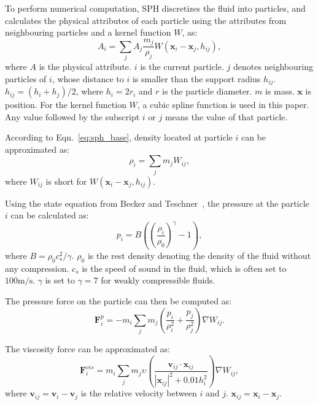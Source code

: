 \documentclass[VANCOUVER,STIX1COL]{WileyNJD-v2}
\begin{document}
To perform numerical computation, SPH discretizes the fluid into particles, and calculates the physical attributes of each particle using the attributes from neighbouring particles and a kernel function $W$, as:
\begin{equation}
    A_i = \sum_j A_j \frac{m_j}{\rho_j} W(\mathbf{x}_i - \mathbf{x}_j, h_{ij}),
    \label{eq:sph_base}
\end{equation}
where $A$ is the physical attribute. $i$ is the current particle. $j$ denotes neighbouring particles of $i$, whose distance to $i$ is smaller than the support radius $h_{ij}$. $h_{ij} = (h_i + h_j) / 2$, where $h_i = 2r_i$ and $r$ is the particle diameter. $m$ is mass. $\mathbf{x}$ is position. For the kernel function $W$, a cubic spline function is used in this paper. Any value followed by the subscript $i$ or $j$ means the value of that particle.

According to Eqn.~\ref{eq:sph_base}, density located at particle $i$ can be approximated as:
\begin{equation}
    \rho_i = \sum_j m_j W_{ij},
    \label{eq:sph_density}
\end{equation}
where $W_{ij}$ is short for $W(\mathbf{x}_i - \mathbf{x}_j, h_{ij})$.

Using the state equation from Becker and Teschner~\cite{Becker07}, the pressure at the particle $i$ can be calculated as:
\begin{equation}
    p_i = B\left(\left(\frac{\rho_i}{\rho_0}\right)^\gamma - 1\right),
\end{equation}
where $B = \rho_0 c_s^2 / \gamma$. $\rho_0$ is the rest density denoting the density of the fluid without any compression. $c_s$ is the speed of sound in the fluid, which is often set to $100\textrm{m}/\textrm{s}$. $\gamma$ is set to $\gamma = 7$ for weakly compressible fluids.

The pressure force on the particle can then be computed as:
\begin{equation}
    \mathbf{F}_i^p = -m_i \sum_j m_j \left(
    \frac{p_i}{\rho_i^2} + \frac{p_j}{\rho_j^2}
    \right)\nabla W_{ij}.
\end{equation}

The viscosity force can be approximated as:
\begin{equation}
    \mathbf{F}_i^{vis} = 
    m_i \sum_j m_j \upsilon \left(\frac{\mathbf{v}_{ij}\cdot\mathbf{x}_{ij}}{|\mathbf{x}_{ij}|^2 + 0.01h_i^2}\right)\nabla W_{ij},
    \label{eq:vis}
\end{equation}
where $\mathbf{v}_{ij} = \mathbf{v}_i - \mathbf{v}_j$ is the relative velocity between $i$ and $j$. $\mathbf{x}_{ij} = \mathbf{x}_i - \mathbf{x}_j$.
\end{document}
